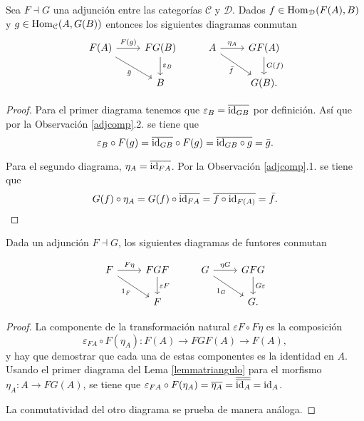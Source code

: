 \documentclass{comunicaciones}
\begin{document}
\begin{lem}\label{lemmatriangulo}
	Sea $F\dashv G$ una adjunci\'on entre las categor\'ias $\mathcal{C}$ y $\mathcal{D}$. Dados $f\in\mathrm{Hom}_\mathcal{D}(F(A),B)$ y $g\in \mathrm{Hom}_\mathcal{C}(A,G(B))$ entonces los siguientes diagramas conmutan
	\[
	\begin{tikzcd}
		F(A) \arrow[r, "F(g)"] \arrow[rd, "\Bar{g}"'] & FG(B) \arrow[d, "\varepsilon_B"] & A \arrow[r, "\eta_A"] \arrow[rd, "\Bar{f}"'] & GF(A) \arrow[d, "G(f)"] \\
		& B & & G(B).                            
	\end{tikzcd}
	\]
\end{lem}

\begin{proof}
	Para el primer diagrama tenemos que $\varepsilon_{B}=\overline{\mathrm{id}_{GB}}$ por definici\'on. As\'i que por la Observaci\'on \ref{adjcomp}.2. se tiene que
	\[\varepsilon_{B}\circ F(g)=\overline{\mathrm{id}_{GB}}\circ F(g)=\overline{\mathrm{id}_{GB}\circ g}=\Bar{g}.\]
	
	Para el segundo diagrama, $\eta_A=\overline{\mathrm{id}_{FA}}$. Por la Observaci\'on \ref{adjcomp}.1. se tiene que
	\[G(f)\circ \eta_A=G(f)\circ\overline{\mathrm{id}_{FA}}=\overline{f\circ \mathrm{id}_{F(A)}}=\Bar{f}.\]
\end{proof}


\begin{prop}\label{identidadestraingulares}
	Dada un adjunci\'on $F\dashv G$, los siguientes diagramas de funtores conmutan
	
	
	\[
	\begin{tikzcd}
		F \arrow[r, "F\eta"] \arrow[rd, "1_F"'] & FGF \arrow[d, "\varepsilon F"] & G \arrow[r, "\eta G"] \arrow[rd, "1_G"'] & GFG \arrow[d, "G\varepsilon"] \\
		& F & & G.                            
	\end{tikzcd}
	\]
\end{prop}

\begin{proof}
	La componente de la transformaci\'on natural $\varepsilon F\circ F\eta$ es la composici\'on 
	\[\varepsilon_{FA}\circ F(\eta_A):F(A)\to FGF(A)\to F(A),\]
	y hay que demostrar que cada una de estas componentes es la identidad en $A$. Usando el primer diagrama del Lema \ref{lemmatriangulo} para el morfismo $\eta_A:A\to FG(A)$, se tiene que $\varepsilon_{FA}\circ F(\eta_A)=\overline{\eta_A}=\overline{\overline{\mathrm{id}_A}}=\mathrm{id}_A$.
	
	La conmutatividad del otro diagrama se prueba de manera an\'aloga.
\end{proof}
\end{document}
